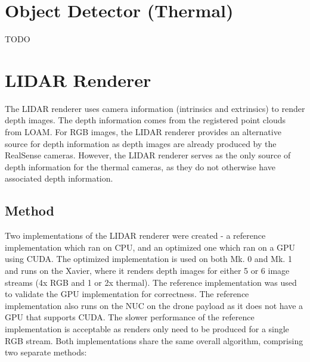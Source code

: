 \section{Object Detector (Thermal)}
TODO

\section{LIDAR Renderer}

The LIDAR renderer uses camera information (intrinsics and extrinsics) to render depth images. The depth information comes from the registered point clouds from LOAM. For RGB images, the LIDAR renderer provides an alternative source for depth information as depth images are already produced by the RealSense cameras. However, the LIDAR renderer serves as the only source of depth information for the thermal cameras, as they do not otherwise have associated depth information.

\subsection{Method}

Two implementations of the LIDAR renderer were created - a reference implementation which ran on CPU, and an optimized one which ran on a GPU using CUDA. The optimized implementation is used on both Mk. 0 and Mk. 1 and runs on the Xavier, where it renders depth images for either 5 or 6 image streams (4x RGB and 1 or 2x thermal). The reference implementation was used to validate the GPU implementation for correctness. The reference implementation also runs on the NUC on the drone payload as it does not have a GPU that supports CUDA. The slower performance of the reference implementation is acceptable as renders only need to be produced for a single RGB stream. Both implementations share the same overall algorithm, comprising two separate methods:

